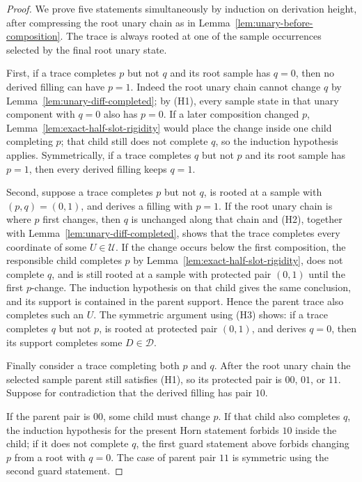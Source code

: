 \documentclass[11pt]{article}
\begin{document}
\begin{proof}
We prove five statements simultaneously by induction on derivation height,
after compressing the root unary chain as in
Lemma~\ref{lem:unary-before-composition}.  The trace is always rooted at one of
the sample occurrences selected by the final root unary state.

First, if a trace completes $p$ but not $q$ and its root sample has $q=0$, then
no derived filling can have $p=1$.  Indeed the root unary chain cannot change
$q$ by Lemma~\ref{lem:unary-diff-completed}; by (H1), every sample state in
that unary component with $q=0$ also has $p=0$.  If a later composition changed
$p$, Lemma~\ref{lem:exact-half-slot-rigidity} would place the change inside one
child completing $p$; that child still does not complete $q$, so the induction
hypothesis applies.  Symmetrically, if a trace completes $q$ but not $p$ and
its root sample has $p=1$, then every derived filling keeps $q=1$.

Second, suppose a trace completes $p$ but not $q$, is rooted at a sample with
$(p,q)=(0,1)$, and derives a filling with $p=1$.  If the root unary chain is
where $p$ first changes, then $q$ is unchanged along that chain and (H2),
together with Lemma~\ref{lem:unary-diff-completed}, shows that the trace
completes every coordinate of some $U\in\mathcal U$.  If the change occurs
below the first composition, the responsible child completes $p$ by
Lemma~\ref{lem:exact-half-slot-rigidity}, does not complete $q$, and is still
rooted at a sample with protected pair $(0,1)$ until the first $p$-change.  The
induction hypothesis on that child gives the same conclusion, and its support
is contained in the parent support.  Hence the parent trace also completes such
an $U$.  The symmetric argument using (H3) shows: if a trace completes $q$ but
not $p$, is rooted at protected pair $(0,1)$, and derives $q=0$, then its
support completes some $D\in\mathcal D$.

Finally consider a trace completing both $p$ and $q$.  After the root unary
chain the selected sample parent still satisfies (H1), so its protected pair is
$00$, $01$, or $11$.  Suppose for contradiction that the derived filling has
pair $10$.

If the parent pair is $00$, some child must change $p$.  If that child also
completes $q$, the induction hypothesis for the present Horn statement forbids
$10$ inside the child; if it does not complete $q$, the first guard statement
above forbids changing $p$ from a root with $q=0$.  The case of parent pair
$11$ is symmetric using the second guard statement.


\end{proof}
\end{document}
